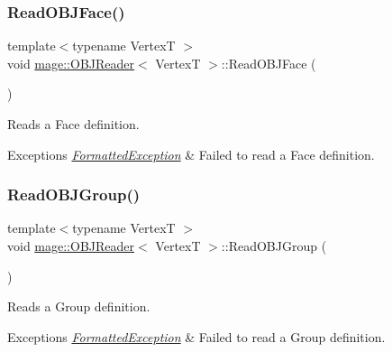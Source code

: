 \subsubsection{\texorpdfstring{Read\+O\+B\+J\+Face()}{ReadOBJFace()}}
{\footnotesize\ttfamily template$<$typename VertexT $>$ \\
void \hyperlink{classmage_1_1_o_b_j_reader}{mage\+::\+O\+B\+J\+Reader}$<$ VertexT $>$\+::Read\+O\+B\+J\+Face (\begin{DoxyParamCaption}{ }\end{DoxyParamCaption})\hspace{0.3cm}{\ttfamily [private]}}

Reads a Face definition.


\begin{DoxyExceptions}{Exceptions}
{\em \hyperlink{structmage_1_1_formatted_exception}{Formatted\+Exception}} & Failed to read a Face definition. \\
\hline
\end{DoxyExceptions}
\hypertarget{classmage_1_1_o_b_j_reader_a8159620b12d426073581202fee022662}{}\label{classmage_1_1_o_b_j_reader_a8159620b12d426073581202fee022662} 
\subsubsection{\texorpdfstring{Read\+O\+B\+J\+Group()}{ReadOBJGroup()}}
{\footnotesize\ttfamily template$<$typename VertexT $>$ \\
void \hyperlink{classmage_1_1_o_b_j_reader}{mage\+::\+O\+B\+J\+Reader}$<$ VertexT $>$\+::Read\+O\+B\+J\+Group (\begin{DoxyParamCaption}{ }\end{DoxyParamCaption})\hspace{0.3cm}{\ttfamily [private]}}

Reads a Group definition.


\begin{DoxyExceptions}{Exceptions}
{\em \hyperlink{structmage_1_1_formatted_exception}{Formatted\+Exception}} & Failed to read a Group definition. \\
\hline
\end{DoxyExceptions}
\hypertarget{classmage_1_1_o_b_j_reader_abc1f67436e50230bd2071b2dc31a4689}{}\label{classmage_1_1_o_b_j_reader_abc1f67436e50230bd2071b2dc31a4689} 
